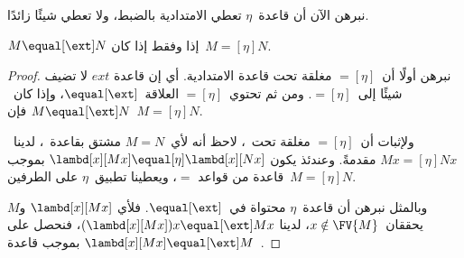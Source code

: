 \documentclass[../../../include/open-logic-section]{subfiles}
\begin{document}
نبرهن الآن أن قاعدة~$\eta$ تعطي الامتدادية بالضبط، ولا تعطي شيئًا زائدًا.

\begin{thm}
  $M \equal[\ext] N$ إذا وفقط إذا كان~$M \equal[\eta] N$.
\end{thm}

\begin{proof}
  نبرهن أولًا أن~$\equal[\eta]$ مغلقة تحت قاعدة الامتدادية. أي إن قاعدة
  $ext$ لا تضيف شيئًا إلى~$\equal[\eta]$. ومن ثم تحتوي~$\equal[\eta]$
  العلاقة~$\equal[\ext]$، وإذا كان~$M \equal[\ext] N$ فإن~$M
  \equal[\eta] N$.

  ولإثبات أن~$\equal[\eta]$ مغلقة تحت~\ext، لاحظ أنه لأي~$M \equal N$
  مشتق بقاعدة~\ext{}، لدينا~$Mx \equal[\eta] Nx$ مقدمةً. وعندئذ يكون
  $\lambd[x][Mx] \equal[\eta] \lambd[x][Nx]$ بموجب قاعدة من قواعد
  $\equal$، ويعطينا تطبيق~$\eta$ على الطرفين~$M \equal[\eta] N$.

  وبالمثل نبرهن أن قاعدة~$\eta$ محتواة في~$\equal[\ext]$. فلأي
  $\lambd[x][Mx]$ و$M$ يحققان~$x \notin \FV{M}$، لدينا
  $(\lambd[x][Mx])x \equal[\ext] Mx$، فنحصل على
  $\lambd[x][Mx] \equal[\ext] M$ بموجب قاعدة~\ext{}.
\end{proof}
\end{document}
